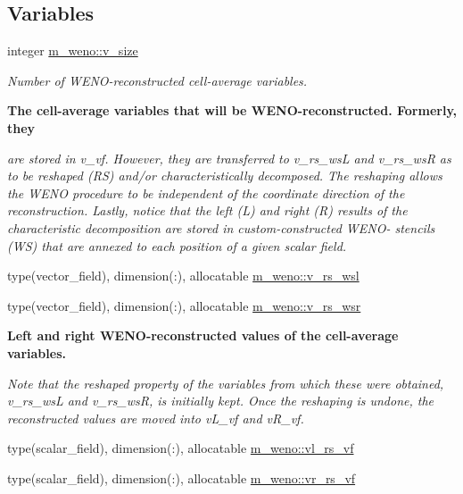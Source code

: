 \subsection*{Variables}
\begin{DoxyCompactItemize}
\item 
integer \hyperlink{namespacem__weno_a91b7a29671368f77d62ab0d3fd9ecff0}{m\+\_\+weno\+::v\+\_\+size}
\begin{DoxyCompactList}\small\item\em Number of W\+E\+N\+O-\/reconstructed cell-\/average variables. \end{DoxyCompactList}\end{DoxyCompactItemize}
\begin{Indent}\textbf{ The cell-\/average variables that will be W\+E\+N\+O-\/reconstructed. Formerly, they}\par
{\em are stored in v\+\_\+vf. However, they are transferred to v\+\_\+rs\+\_\+wsL and v\+\_\+rs\+\_\+wsR as to be reshaped (RS) and/or characteristically decomposed. The reshaping allows the W\+E\+NO procedure to be independent of the coordinate direction of the reconstruction. Lastly, notice that the left (L) and right (R) results of the characteristic decomposition are stored in custom-\/constructed W\+E\+N\+O-\/ stencils (WS) that are annexed to each position of a given scalar field. }\begin{DoxyCompactItemize}
\item 
type(vector\+\_\+field), dimension(\+:), allocatable \hyperlink{namespacem__weno_a93ac8fcccd75977762710ff8c97e00cd}{m\+\_\+weno\+::v\+\_\+rs\+\_\+wsl}
\item 
type(vector\+\_\+field), dimension(\+:), allocatable \hyperlink{namespacem__weno_acf9ad1f7c2c83efea07eecbdef783431}{m\+\_\+weno\+::v\+\_\+rs\+\_\+wsr}
\end{DoxyCompactItemize}
\end{Indent}
\begin{Indent}\textbf{ Left and right W\+E\+N\+O-\/reconstructed values of the cell-\/average variables.}\par
{\em Note that the reshaped property of the variables from which these were obtained, v\+\_\+rs\+\_\+wsL and v\+\_\+rs\+\_\+wsR, is initially kept. Once the reshaping is undone, the reconstructed values are moved into v\+L\+\_\+vf and v\+R\+\_\+vf. }\begin{DoxyCompactItemize}
\item 
type(scalar\+\_\+field), dimension(\+:), allocatable \hyperlink{namespacem__weno_a4f4ba6cc4536855c0302a88c05b8618e}{m\+\_\+weno\+::vl\+\_\+rs\+\_\+vf}
\item 
type(scalar\+\_\+field), dimension(\+:), allocatable \hyperlink{namespacem__weno_ad1481768af62b47f857535c4a08f20d0}{m\+\_\+weno\+::vr\+\_\+rs\+\_\+vf}
\end{DoxyCompactItemize}
\end{Indent}
